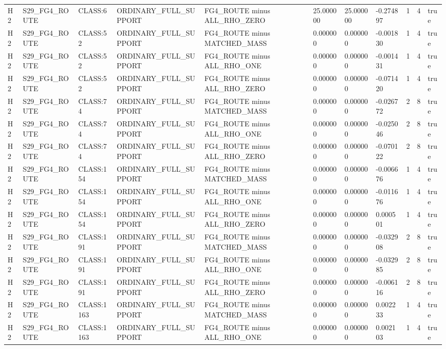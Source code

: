 \begin{tabular}{lllllllllll}
H2 & S29\_FG4\_ROUTE & CLASS:6 & ORDINARY\_FULL\_SUPPORT & FG4\_ROUTE minus ALL\_RHO\_ZERO & 25.000000 & 25.000000 & -0.274897 & 1 & 4 & true \\
H2 & S29\_FG4\_ROUTE & CLASS:52 & ORDINARY\_FULL\_SUPPORT & FG4\_ROUTE minus MATCHED\_MASS & 0.000000 & 0.000000 & -0.001830 & 1 & 4 & true \\
H2 & S29\_FG4\_ROUTE & CLASS:52 & ORDINARY\_FULL\_SUPPORT & FG4\_ROUTE minus ALL\_RHO\_ONE & 0.000000 & 0.000000 & -0.001431 & 1 & 4 & true \\
H2 & S29\_FG4\_ROUTE & CLASS:52 & ORDINARY\_FULL\_SUPPORT & FG4\_ROUTE minus ALL\_RHO\_ZERO & 0.000000 & 0.000000 & -0.071420 & 1 & 4 & true \\
H2 & S29\_FG4\_ROUTE & CLASS:74 & ORDINARY\_FULL\_SUPPORT & FG4\_ROUTE minus MATCHED\_MASS & 0.000000 & 0.000000 & -0.026772 & 2 & 8 & true \\
H2 & S29\_FG4\_ROUTE & CLASS:74 & ORDINARY\_FULL\_SUPPORT & FG4\_ROUTE minus ALL\_RHO\_ONE & 0.000000 & 0.000000 & -0.025046 & 2 & 8 & true \\
H2 & S29\_FG4\_ROUTE & CLASS:74 & ORDINARY\_FULL\_SUPPORT & FG4\_ROUTE minus ALL\_RHO\_ZERO & 0.000000 & 0.000000 & -0.070122 & 2 & 8 & true \\
H2 & S29\_FG4\_ROUTE & CLASS:154 & ORDINARY\_FULL\_SUPPORT & FG4\_ROUTE minus MATCHED\_MASS & 0.000000 & 0.000000 & -0.006676 & 1 & 4 & true \\
H2 & S29\_FG4\_ROUTE & CLASS:154 & ORDINARY\_FULL\_SUPPORT & FG4\_ROUTE minus ALL\_RHO\_ONE & 0.000000 & 0.000000 & -0.011676 & 1 & 4 & true \\
H2 & S29\_FG4\_ROUTE & CLASS:154 & ORDINARY\_FULL\_SUPPORT & FG4\_ROUTE minus ALL\_RHO\_ZERO & 0.000000 & 0.000000 & 0.000501 & 1 & 4 & true \\
H2 & S29\_FG4\_ROUTE & CLASS:191 & ORDINARY\_FULL\_SUPPORT & FG4\_ROUTE minus MATCHED\_MASS & 0.000000 & 0.000000 & -0.032908 & 2 & 8 & true \\
H2 & S29\_FG4\_ROUTE & CLASS:191 & ORDINARY\_FULL\_SUPPORT & FG4\_ROUTE minus ALL\_RHO\_ONE & 0.000000 & 0.000000 & -0.032985 & 2 & 8 & true \\
H2 & S29\_FG4\_ROUTE & CLASS:191 & ORDINARY\_FULL\_SUPPORT & FG4\_ROUTE minus ALL\_RHO\_ZERO & 0.000000 & 0.000000 & -0.006116 & 2 & 8 & true \\
H2 & S29\_FG4\_ROUTE & CLASS:1163 & ORDINARY\_FULL\_SUPPORT & FG4\_ROUTE minus MATCHED\_MASS & 0.000000 & 0.000000 & 0.002233 & 1 & 4 & true \\
H2 & S29\_FG4\_ROUTE & CLASS:1163 & ORDINARY\_FULL\_SUPPORT & FG4\_ROUTE minus ALL\_RHO\_ONE & 0.000000 & 0.000000 & 0.002103 & 1 & 4 & true \\

\end{tabular}
